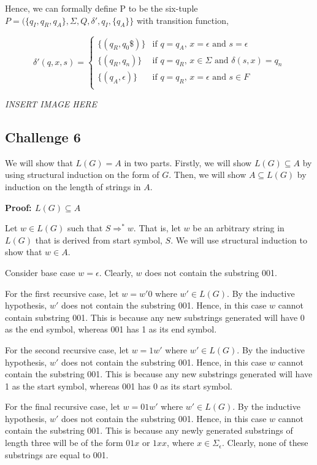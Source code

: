 \documentclass[12pt]{article}
\newcommand{\impl}{\mathbin{\Rightarrow}}
\begin{document}
\bigskip
\noindent
Hence, we can formally define P to be the six-tuple $P=(\{q_I, q_R, q_A\}, \Sigma, Q, \delta', q_I, \{q_A\}\}$
with transition function,

\[
  \delta'(q, x, s) =
  \begin{cases}
  	\{(q_R, q_0\$)\}   & \text{if $q=q_A$, $x=\epsilon$ and $s=\epsilon$} \\
      \{(q_R, q_n)\}        & \text{if $q=q_R$, $x \in \Sigma$ and $\delta (s, x)=q_n$} \\
      \{(q_A, \epsilon)\} & \text{if $q=q_R$, $x=\epsilon$ and $s \in F$} \\
  \end{cases}
\]

\emph{INSERT IMAGE HERE}


\subsection*{Challenge 6}
We will show that $L(G) = A$ in two parts. Firstly, we will show $L(G) \subseteq A$ by using structural induction
on the form of $G$. Then, we will show $A \subseteq L(G)$ by induction on the length of strings in $A$.

\bigskip
\noindent
\textbf{Proof: $L(G) \subseteq A$}

\bigskip
\noindent
Let $w \in L(G)$ such that $S \impl^* w$. That is, let $w$ be an arbitrary string in $L(G)$ that is derived from 
start symbol, $S$. We will use structural induction to show that $w \in A$.

\bigskip
\noindent
Consider base case $w = \epsilon$. Clearly, $w$ does not contain the substring 001.

\bigskip
\noindent
For the first recursive case, let $w=w'0$ where $w' \in L(G)$. By the inductive hypothesis, $w'$ does not contain
the substring 001. Hence, in this case $w$ cannot contain substring 001. This is because any new substrings generated 
will have 0 as the end symbol, whereas 001 has 1 as its end symbol.

\bigskip
\noindent
For the second recursive case, let $w=1w'$ where $w' \in L(G)$. By the inductive hypothesis, $w'$ does not contain
the substring 001. Hence, in this case $w$ cannot contain the substring 001. This is because any new substrings generated 
will have 1 as the start symbol, whereas 001 has 0 as its start symbol.

\bigskip
\noindent
For the final recursive case, let $w=01w'$ where $w' \in L(G)$. By the inductive hypothesis, $w'$ does not contain the
substring 001. Hence, in this case $w$ cannot contain the substring 001. This is because any newly generated substrings
of length three will be of the form $01x$ or $1xx$, where $x \in \Sigma_\epsilon$. Clearly, none of these substrings are equal to 001.
\end{document}
